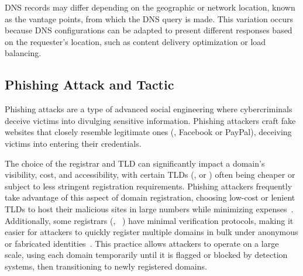 DNS records may differ depending on the geographic or network location, known as the vantage points, from which the DNS query is made. This variation occurs because DNS configurations can be adapted to present different responses based on the requester’s location,
such as content delivery optimization or load balancing. 









\subsection{Phishing Attack and Tactic}
Phishing attacks are a type of advanced social engineering where cybercriminals deceive victims into divulging sensitive information. 
Phishing attackers craft fake websites that closely resemble legitimate ones (\eg, Facebook or PayPal), deceiving victims into entering their credentials. 

The choice of the registrar and TLD can significantly impact a domain's visibility, cost, and accessibility, with certain TLDs (\eg,  or ) often being cheaper or subject to less stringent registration requirements. 
Phishing attackers frequently take advantage of this aspect of domain registration, choosing low-cost or lenient TLDs to host their malicious sites in large numbers while minimizing expenses~\cite{moura2024characterizing}.
Additionally, some registrars (\eg,   ~\cite{AlibabaC38:online}) have minimal verification protocols, making it easier for attackers to quickly register multiple domains in bulk under anonymous or fabricated identities~\cite{NewUserD82:online}.
This practice allows attackers to operate on a large scale, using each domain temporarily until it is flagged or blocked by detection systems, then transitioning to newly registered domains.




